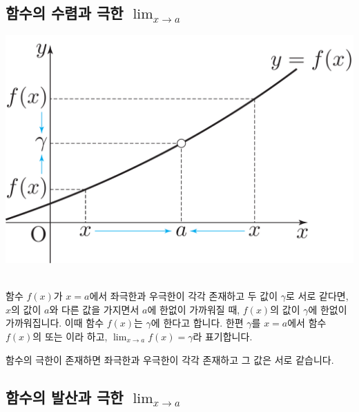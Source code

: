 \subsection{함수의 수렴과 극한 $\lim_{x \to a}$}
\begin{center} \includegraphics[scale=\pgfkeysvalueof{picsize}]{DBs/pic/zerr_04.pdf}\
	\end{center}함수 $f\left( x \right) $가 $x=a$에서 좌극한과 우극한이 각각 존재하고 두 값이 $\gamma$로 서로 같다면, $x$의 값이 $a$와 다른 값을 가지면서 $a$에 한없이 가까워질 때, $f\left( x \right) $의 값이 $\gamma$에 한없이 가까워집니다. 이때 함수 $f\left( x \right) $는 $\gamma$에 한다고 합니다. 한편 $\gamma$를 $x=a$에서 함수 $f\left( x \right) $의  또는 이라 하고, $\lim_{x \to a}f\left( x \right) =\gamma$라 표기합니다.

함수의 극한이 존재하면 좌극한과 우극한이 각각 존재하고 그 값은 서로 같습니다.

\subsection{함수의 발산과 극한 $\lim_{x \to a}$}

